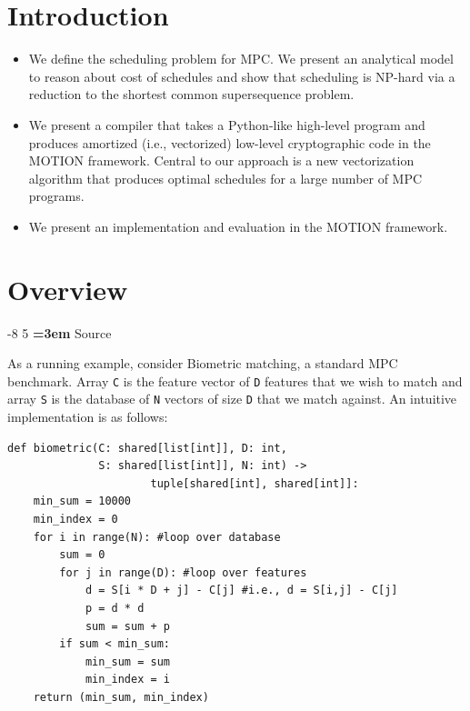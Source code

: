 \documentclass[sigconf, screen, natbib=false, dvipsnames, table]{acmart}
\makeatletter
\renewcommand{\subsection}{\@startsection{subsection}{2}{\z@}%
                        {-8\p@ \@plus -4\p@ \@minus -4\p@}%
                        {5\p@ \@plus 2\p@ \@minus 2\p@}%
                        {\normalfont\Large\bfseries\boldmath
                         \rightskip=\z@ \@plus 3em\pretolerance=10000 }}
\theoremstyle{definition}
\makeatother
\begin{document}
\section{Introduction}
\label{sec:introduction}

\begin{itemize}
\item We define the scheduling problem for MPC. 
We present an analytical model to reason about cost of schedules
and show that scheduling is NP-hard via a reduction to the shortest 
common supersequence problem.

\item We present a compiler that takes a Python-like high-level 
program and produces amortized (i.e., vectorized) low-level cryptographic 
code in the MOTION framework. Central to our approach is a new 
vectorization algorithm that produces optimal schedules for a large 
number of MPC programs.

\item We present an implementation and evaluation in the MOTION framework. 


\end{itemize}

\section{Overview}
\label{sec:overview}

\subsection{Source}

As a running example, consider Biometric matching, a standard MPC benchmark.
Array \texttt{C} is the feature vector of \texttt{D} features that we wish to match and array \texttt{S} 
is the database of \texttt{N} vectors of size \texttt{D} that we match against.
An intuitive implementation is as follows:

{\small
\begin{verbatim}
def biometric(C: shared[list[int]], D: int, 
              S: shared[list[int]], N: int) -> 
                      tuple[shared[int], shared[int]]:
    min_sum = 10000
    min_index = 0  
    for i in range(N): #loop over database
        sum = 0
        for j in range(D): #loop over features
            d = S[i * D + j] - C[j] #i.e., d = S[i,j] - C[j]
            p = d * d
            sum = sum + p
        if sum < min_sum:
            min_sum = sum
            min_index = i
    return (min_sum, min_index)
\end{verbatim}
}
\end{document}
